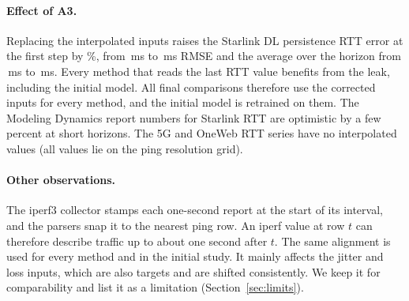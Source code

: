 \paragraph{Effect of A3.} Replacing the interpolated inputs raises the Starlink DL persistence RTT error at the first step by \AuditPersHonePct\%, from \AuditPersLegacyHone\,ms to \AuditPersCausalHone\,ms RMSE and the average over the horizon from \AuditPersLegacyAvg\,ms to \AuditPersCausalAvg\,ms. Every method that reads the last RTT value benefits from the leak, including the initial model. All final comparisons therefore use the corrected inputs for every method, and the initial model is retrained on them. The Modeling Dynamics report numbers for Starlink RTT are optimistic by a few percent at short horizons. The 5G and OneWeb RTT series have no interpolated values (all values lie on the ping resolution grid).

\paragraph{Other observations.} The iperf3 collector stamps each one-second report at the start of its interval, and the parsers snap it to the nearest ping row. An iperf value at row $t$ can therefore describe traffic up to about one second after $t$. The same alignment is used for every method and in the initial study. It mainly affects the jitter and loss inputs, which are also targets and are shifted consistently. We keep it for comparability and list it as a limitation (Section~\ref{sec:limits}).
